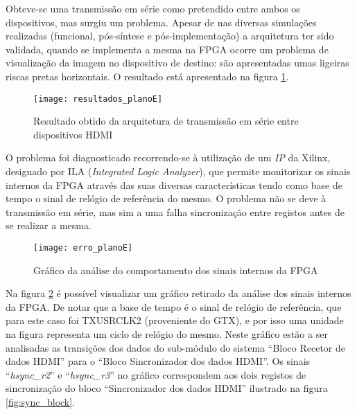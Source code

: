 
Obteve-se uma transmissão em série como pretendido entre ambos os dispositivos, mas surgiu um problema. Apesar de nas diversas simulações realizadas (funcional, pós-síntese e pós-implementação) a arquitetura ter sido validada, quando se implementa a mesma na FPGA ocorre um problema de visualização da imagem no dispositivo de destino: são apresentadas umas ligeiras riscas pretas horizontais. O resultado está apresentado na figura \ref{fig:planoE_results}.


\begin{figure}
	\begin{center}
	\leavevmode
	\texttt{[image: resultados\_planoE]}
	\captionsetup{width=1.0\linewidth}
	\caption[Resultado obtido da arquitetura de transmissão em série entre dispositivos HDMI]{Resultado obtido da arquitetura de transmissão em série entre dispositivos HDMI}
	\label{fig:planoE_results}
\end{center}
\end{figure}

O problema foi diagnosticado recorrendo-se à utilização de um \textit{IP} da Xilinx, designado por ILA (\textit{Integrated Logic Analyzer}), que permite monitorizar os sinais internos da FPGA através das suas diversas características tendo como base de tempo o sinal de relógio de referência do mesmo. O problema não se deve à transmissão em série, mas sim a uma falha sincronização entre registos antes de se realizar a mesma.

\begin{figure}
	\begin{center}
		\leavevmode
		\texttt{[image: erro\_planoE]}
		\captionsetup{width=1.0\linewidth}
		\caption[Gráfico da análise do comportamento dos sinais internos da FPGA]{Gráfico da análise do comportamento dos sinais internos da FPGA}
		\label{fig:planoE_rerro}
	\end{center}
\end{figure}

Na figura \ref{fig:planoE_rerro} é possível visualizar um gráfico retirado da análise dos sinais internos da FPGA. De notar que a base de tempo é o sinal de relógio de referência, que para este caso foi TXUSRCLK2 (proveniente do GTX), e por isso uma unidade na figura representa um ciclo de relógio do mesmo.  Neste gráfico estão a ser analisadas as transições dos dados do sub-módulo do sistema ``Bloco Recetor de dados HDMI'' para o ``Bloco Sincronizador dos dados HDMI''. Os sinais ``\textit{hsync\_r2}'' e ``\textit{hsync\_r3}'' no gráfico correspondem aos dois registos de sincronização do bloco ``Sincronizador dos dados HDMI'' ilustrado na figura \ref{fig:sync_block}.

